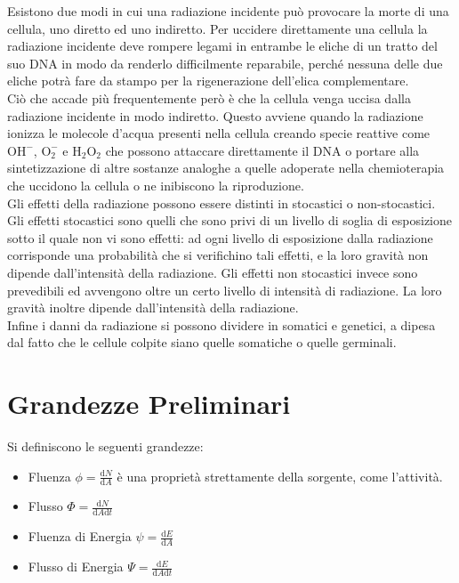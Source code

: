 \documentclass [a4paper, twoside] {book}
\begin{document}
Esistono due modi in cui una radiazione incidente può provocare la morte di una cellula, uno diretto ed uno indiretto. Per uccidere direttamente una cellula la radiazione incidente deve rompere legami in entrambe le eliche di un tratto del suo DNA in modo da renderlo difficilmente reparabile, perché nessuna delle due eliche potrà fare da stampo per la rigenerazione dell'elica complementare. \\
Ciò che accade più frequentemente però è che la cellula venga uccisa dalla radiazione incidente in modo indiretto. Questo avviene quando la radiazione ionizza le molecole d'acqua presenti nella cellula creando specie reattive come $\text{OH}^{-}$, $\text{O}_2^{-}$ e $\text{H}_2\text{O}_2$ che possono attaccare direttamente il DNA o portare alla sintetizzazione di altre sostanze analoghe a quelle adoperate nella chemioterapia che uccidono la cellula o ne inibiscono la riproduzione.\\
Gli effetti della radiazione possono essere distinti in stocastici o non-stocastici. Gli effetti stocastici sono quelli che sono privi di un livello di soglia di esposizione sotto il quale non vi sono effetti: ad ogni livello di esposizione dalla radiazione corrisponde una probabilità che si verifichino tali effetti, e la loro gravità non dipende dall'intensità della radiazione. Gli effetti non stocastici invece sono prevedibili ed avvengono oltre un certo livello di intensità di radiazione. La loro gravità inoltre dipende dall'intensità della radiazione.\\
Infine i danni da radiazione si possono dividere in somatici e genetici, a dipesa dal fatto che le cellule colpite siano quelle somatiche o quelle germinali.


\section{Grandezze Preliminari}

Si definiscono le seguenti grandezze:

\begin{itemize}
\item Fluenza $\phi=\frac{\mathrm{d}N}{\mathrm{d}A}$ è una proprietà strettamente della sorgente, come l'attività.
\item Flusso $\Phi=\frac{\mathrm{d}N}{\mathrm{d}A\mathrm{d}t}$
\item Fluenza di Energia $\psi=\frac{\mathrm{d}E}{\mathrm{d}A}$
\item Flusso di Energia $\Psi=\frac{\mathrm{d}E}{\mathrm{d}A\mathrm{d}t}$
\end{itemize}
\end{document}
